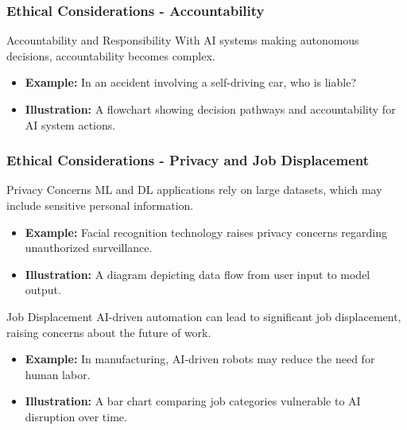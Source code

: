 \documentclass[aspectratio=169]{beamer}
\begin{document}
\begin{frame}[fragile]
    \frametitle{Ethical Considerations - Accountability}
    \begin{block}{Accountability and Responsibility}
        With AI systems making autonomous decisions, accountability becomes complex.
        \begin{itemize}
            \item \textbf{Example:} In an accident involving a self-driving car, who is liable?
            \item \textbf{Illustration:} A flowchart showing decision pathways and accountability for AI system actions.
        \end{itemize}
    \end{block}
\end{frame}

\begin{frame}[fragile]
    \frametitle{Ethical Considerations - Privacy and Job Displacement}
    \begin{block}{Privacy Concerns}
        ML and DL applications rely on large datasets, which may include sensitive personal information.
        \begin{itemize}
            \item \textbf{Example:} Facial recognition technology raises privacy concerns regarding unauthorized surveillance.
            \item \textbf{Illustration:} A diagram depicting data flow from user input to model output.
        \end{itemize}
    \end{block}
    
    \begin{block}{Job Displacement}
        AI-driven automation can lead to significant job displacement, raising concerns about the future of work.
        \begin{itemize}
            \item \textbf{Example:} In manufacturing, AI-driven robots may reduce the need for human labor.
            \item \textbf{Illustration:} A bar chart comparing job categories vulnerable to AI disruption over time.
        \end{itemize}
    \end{block}
\end{frame}
\end{document}
